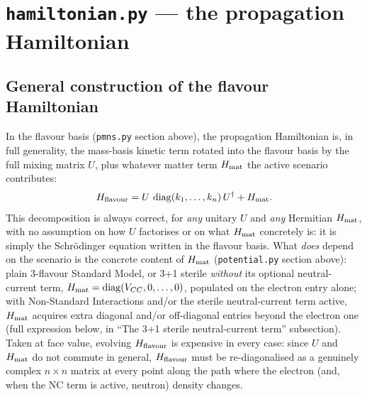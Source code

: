 \section{\texttt{hamiltonian.py} --- the propagation Hamiltonian}


\begin{theorybox}
\subsection*{General construction of the flavour Hamiltonian}
In the flavour basis (\texttt{pmns.py} section above), the propagation
Hamiltonian is, in full generality, the mass-basis kinetic term rotated
into the flavour basis by the full mixing matrix $U$, plus whatever matter
term $H_{\rm mat}$ the active scenario contributes:
\begin{equation}
  H_{\rm flavour} = U\,\operatorname{diag}(k_1,\dots,k_n)\,U^\dagger + H_{\rm mat}.
\end{equation}
This decomposition is always correct, for \emph{any} unitary $U$ and
\emph{any} Hermitian $H_{\rm mat}$, with no assumption on how $U$
factorises or on what $H_{\rm mat}$ concretely is: it is simply the
Schr\"odinger equation written in the flavour basis. What \emph{does}
depend on the scenario is the concrete content of $H_{\rm mat}$
(\texttt{potential.py} section above): plain 3-flavour Standard Model, or
3+1 sterile \emph{without} its optional neutral-current term,
$H_{\rm mat}=\operatorname{diag}(V_{CC},0,\dots,0)$, populated on the electron entry
alone; with Non-Standard Interactions and/or the sterile neutral-current
term active, $H_{\rm mat}$ acquires extra diagonal and/or off-diagonal
entries beyond the electron one (full expression below, in ``The 3+1
sterile neutral-current term'' subsection). Taken at face value, evolving
$H_{\rm flavour}$ is expensive in every case: since $U$ and $H_{\rm mat}$ do
not commute in general, $H_{\rm flavour}$ must be re-diagonalised as a
genuinely complex $n\times n$ matrix at every point along the path where
the electron (and, when the NC term is active, neutron) density changes.



\end{theorybox}
